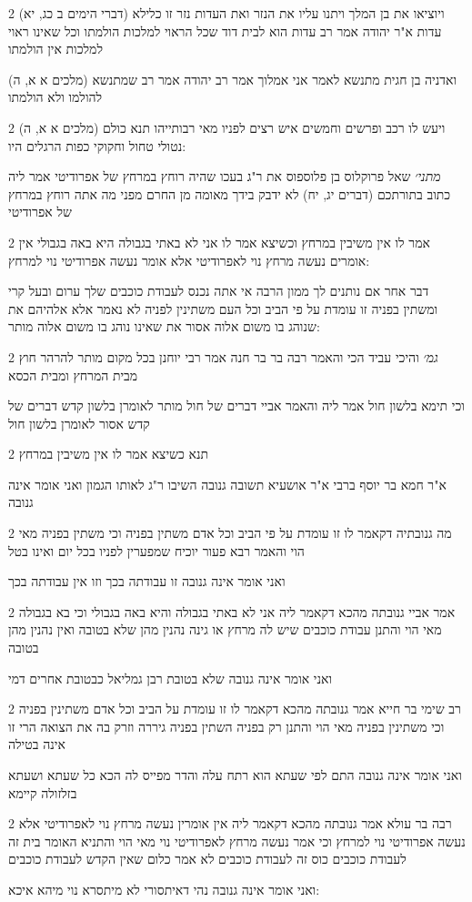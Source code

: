 \documentclass[12pt, openany]{book}
\newcommand{\sethebfont}{
\fontsize{10.5pt}{21.0pt} \selectfont
}
\newcommand{\twocol}[1]{
	{\sethebfont \begin{multicols}{2}
			#1
	\end{multicols}}	
}
\begin{document}
\twocol{(דברי הימים ב כג, יא) ויוציאו את בן המלך ויתנו עליו את הנזר ואת העדות נזר זו כלילא עדות א"ר יהודה אמר רב עדות הוא לבית דוד שכל הראוי למלכות הולמתו וכל שאינו ראוי למלכות אין הולמתו
\par (מלכים א א, ה) ואדניה בן חגית מתנשא לאמר אני אמלוך אמר רב יהודה אמר רב שמתנשא להולמו ולא הולמתו}
\twocol{(מלכים א א, ה) ויעש לו רכב ופרשים וחמשים איש רצים לפניו מאי רבותייהו תנא כולם נטולי טחול וחקוקי כפות הרגלים היו:
\par {\large\emph{מתני׳}} שאל פרוקלוס בן פלוספוס את ר"ג בעכו שהיה רוחץ במרחץ של אפרודיטי אמר ליה כתוב בתורתכם (דברים יג, יח) לא ידבק בידך מאומה מן החרם מפני מה אתה רוחץ במרחץ של אפרודיטי}
\twocol{אמר לו אין משיבין במרחץ וכשיצא אמר לו אני לא באתי בגבולה היא באה בגבולי אין אומרים נעשה מרחץ נוי לאפרודיטי אלא אומר נעשה אפרודיטי נוי למרחץ:
\par דבר אחר אם נותנים לך ממון הרבה אי אתה נכנס לעבודת כוכבים שלך ערום ובעל קרי ומשתין בפניה זו עומדת על פי הביב וכל העם משתינין לפניה לא נאמר אלא אלהיהם את שנוהג בו משום אלוה אסור את שאינו נוהג בו משום אלוה מותר:}
\twocol{{\large\emph{גמ׳}} והיכי עביד הכי והאמר רבה בר בר חנה אמר רבי יוחנן בכל מקום מותר להרהר חוץ מבית המרחץ ומבית הכסא
\par וכי תימא בלשון חול אמר ליה והאמר אביי דברים של חול מותר לאומרן בלשון קדש דברים של קדש אסור לאומרן בלשון חול}
\twocol{תנא כשיצא אמר לו אין משיבין במרחץ
\par א"ר חמא בר יוסף ברבי א"ר אושעיא תשובה גנובה השיבו ר"ג לאותו הגמון ואני אומר אינה גנובה}
\twocol{מה גנובתיה דקאמר לו זו עומדת על פי הביב וכל אדם משתין בפניה וכי משתין בפניה מאי הוי והאמר רבא פעור יוכיח שמפערין לפניו בכל יום ואינו בטל
\par ואני אומר אינה גנובה זו עבודתה בכך וזו אין עבודתה בכך}
\twocol{אמר אביי גנובתה מהכא דקאמר ליה אני לא באתי בגבולה והיא באה בגבולי וכי בא בגבולה מאי הוי והתנן עבודת כוכבים שיש לה מרחץ או גינה נהנין מהן שלא בטובה ואין נהנין מהן בטובה
\par ואני אומר אינה גנובה שלא בטובת רבן גמליאל כבטובת אחרים דמי}
\twocol{רב שימי בר חייא אמר גנובתה מהכא דקאמר לו זו עומדת על הביב וכל אדם משתינין בפניה וכי משתינין בפניה מאי הוי והתנן רק בפניה השתין בפניה גיררה וזרק בה את הצואה הרי זו אינה בטילה
\par ואני אומר אינה גנובה התם לפי שעתא הוא רתח עלה והדר מפייס לה הכא כל שעתא ושעתא בזלזולה קיימא}
\twocol{רבה בר עולא אמר גנובתה מהכא דקאמר ליה אין אומרין נעשה מרחץ נוי לאפרודיטי אלא נעשה אפרודיטי נוי למרחץ וכי אמר נעשה מרחץ לאפרודיטי נוי מאי הוי והתניא האומר בית זה לעבודת כוכבים כוס זה לעבודת כוכבים לא אמר כלום שאין הקדש לעבודת כוכבים
\par ואני אומר אינה גנובה נהי דאיתסורי לא מיתסרא נוי מיהא איכא:}
\end{document}
